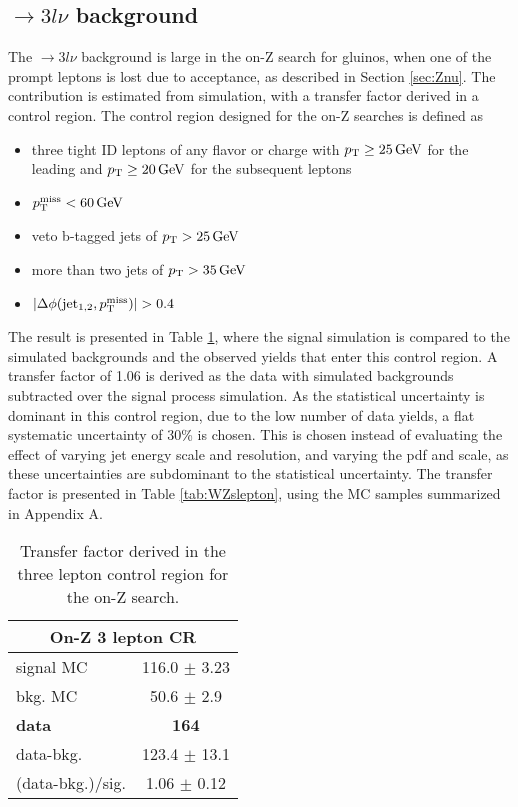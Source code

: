 \subsection*{\PWZ$\rightarrow3l\nu$ background}\label{sec:Znustrong}
\noindent\justify
The \PWZ$\rightarrow3l\nu$ background is large in the on-Z search for gluinos, when one of the prompt leptons is lost due to acceptance, as described in Section \ref{sec:Znu}. 
The contribution is estimated from simulation, with a transfer factor derived in a \PWZ control region. 
The \PWZ control region designed for the on-Z searches is defined as
\begin{itemize}
    \item three tight ID leptons of any flavor or charge with $p_{\mathrm{T}}\geq25\,\text{Ge\hspace{-.08em}V}$ for the leading and $p_{\mathrm{T}}\geq20\,\text{Ge\hspace{-.08em}V}$ for the subsequent leptons
    \item $p_{\mathrm{T}}^\text{miss}<60\,\text{Ge\hspace{-.08em}V}$
    \item veto b-tagged jets of $p_{\mathrm{T}}>25\,\text{Ge\hspace{-.08em}V}$
    \item more than two jets of $p_{\mathrm{T}}>35\,\text{Ge\hspace{-.08em}V}$
    \item $|\Delta\phi(\mathrm{jet_{1,2}}, \ptmiss)|>0.4$
\end{itemize}
\newpara
\noindent\justify
The result is presented in Table \ref{tab:WZonZ}, where the \PWZ signal simulation is compared to the simulated backgrounds and the observed yields that enter this control region.
A transfer factor of 1.06 is derived as the data with simulated backgrounds subtracted over the signal process simulation.
As the statistical uncertainty is dominant in this control region, due to the low number of data yields, a flat systematic uncertainty of 30\% is chosen.
This is chosen instead of evaluating the effect of varying jet energy scale and resolution, and varying the pdf and scale, as these uncertainties are subdominant to the statistical uncertainty.
The transfer factor is presented in Table \ref{tab:WZslepton}, using the MC samples summarized in Appendix A.
\begin{table}[ht!]
\def\arraystretch{1.2}
\setlength{\belowcaptionskip}{6pt}
\small
\centering
\caption{Transfer factor derived in the three lepton control region for the on-Z search.}
\label{tab:WZonZ}
\begin{tabular}{l c }
\hline \hline
\multicolumn{2}{c}{On-Z 3 lepton CR}  \\\hline
signal MC        & 116.0     $\pm$  3.23    \\
bkg. MC          & 50.6  $\pm$  2.9\\ \hline
\textbf{data}       & \textbf{164}  \\
data-bkg.        &  123.4   $\pm$  13.1 \\ \hline
(data-bkg.)/sig. & 1.06   $\pm$  0.12\\ \hline\hline
\end{tabular}
\end{table}
